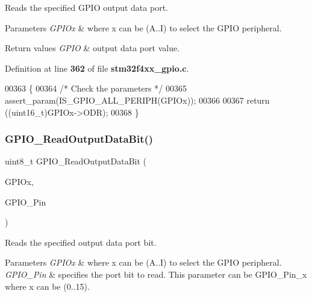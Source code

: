 Reads the specified G\+P\+IO output data port. 


\begin{DoxyParams}{Parameters}
{\em G\+P\+I\+Ox} & where x can be (A..I) to select the G\+P\+IO peripheral. \\
\hline
\end{DoxyParams}

\begin{DoxyRetVals}{Return values}
{\em G\+P\+IO} & output data port value. \\
\hline
\end{DoxyRetVals}


Definition at line \textbf{ 362} of file \textbf{ stm32f4xx\+\_\+gpio.\+c}.


\begin{DoxyCode}
00363 \{
00364   \textcolor{comment}{/* Check the parameters */}
00365   assert_param(IS_GPIO_ALL_PERIPH(GPIOx));
00366 
00367   \textcolor{keywordflow}{return} ((uint16\_t)GPIOx->ODR);
00368 \}
\end{DoxyCode}
\mbox{\label{group__GPIO__Group2_ga138270f8695b105b7c6ed405792919c1}} 
\subsubsection{G\+P\+I\+O\+\_\+\+Read\+Output\+Data\+Bit()}
{\footnotesize\ttfamily uint8\+\_\+t G\+P\+I\+O\+\_\+\+Read\+Output\+Data\+Bit (\begin{DoxyParamCaption}\item[{\textbf{ G\+P\+I\+O\+\_\+\+Type\+Def} $\ast$}]{G\+P\+I\+Ox,  }\item[{uint16\+\_\+t}]{G\+P\+I\+O\+\_\+\+Pin }\end{DoxyParamCaption})}



Reads the specified output data port bit. 


\begin{DoxyParams}{Parameters}
{\em G\+P\+I\+Ox} & where x can be (A..I) to select the G\+P\+IO peripheral. \\
\hline
{\em G\+P\+I\+O\+\_\+\+Pin} & specifies the port bit to read. This parameter can be G\+P\+I\+O\+\_\+\+Pin\+\_\+x where x can be (0..15). \\
\hline
\end{DoxyParams}

